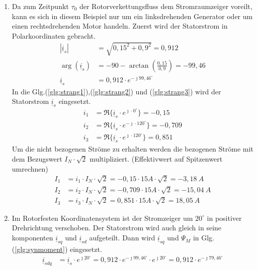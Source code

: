 \begin{solution}
	\begin{enumerate}
		\item Da zum Zeitpunkt $\tau_0$ der Rotorverkettungsfluss dem Stromraumzeiger voreilt, kann es sich in diesem Beispiel nur um ein linksdrehenden Generator oder um einen rechtsdrehenden Motor handeln. Zuerst wird der Statorstrom in Polarkoordinaten gebracht.
		\begin{align}
			|\underline{i}_s|  &= \sqrt{0,15^2 + 0,9^2}= 0,912 \\
			\arg(\underline{i}_s) & =-90 - \arctan\left (\frac{0,15}{0,9} \right ) =-99,46 \\
			\underline{i}_s  &= 0,912 \cdot e^{-\jmath 99,46 ^\circ}
		\end{align}
		In die Glg.(\ref{glg:strang1}),(\ref{glg:strang2}) und (\ref{glg:strang3}) wird der Statorstrom $\underline{i}_s$ eingesetzt.
		\begin{align}
			i_1 & = \Re \{ \underline{i}_s \cdot e^{\jmath \cdot 0 ^\circ} \} = -0,15\\
			i_2 & = \Re \{ \underline{i}_s \cdot e^{-\jmath \cdot 120 ^\circ} \} = -0,709 \\
			i_3 & = \Re \{ \underline{i}_s \cdot e^{\jmath \cdot 120 ^\circ} \}=  0,851
		\end{align}
		Um die nicht bezogenen Ströme zu erhalten werden die bezogenen Ströme mit dem Bezugswert $I_N \cdot \sqrt{2}$ multipliziert. (Effektivwert auf Spitzenwert umrechnen)
		\begin{align}
			I_1 & = i_1 \cdot I_N \cdot \sqrt{2} = -0,15 \cdot 15 A \cdot \sqrt{2} =-3,18~A \\
			I_2 & = i_2 \cdot I_N \cdot \sqrt{2} = -0,709 \cdot 15 A \cdot \sqrt{2} = -15,04~A\\
			I_3 & = i_3 \cdot I_N \cdot \sqrt{2} = 0,851\cdot 15 A \cdot \sqrt{2} =18,05~A
		\end{align}
		\item Im Rotorfesten Koordinatensystem ist der Stromzeiger um $20^\circ$ in positiver Drehrichtung verschoben. Der Statorstrom wird auch gleich in seine komponenten $\underline{i}_{sq}$ und $\underline{i}_{sd}$ aufgeteilt. Dann wird $\underline{i}_{sq}$ und $\Psi_M$ in Glg.(\ref{glg:synmoment}) eingesetzt.
		\begin{align}
			\underline{i}_{sdq} & = \underline{i}_s \cdot e^{\jmath 20 ^\circ} = 0,912 \cdot e^{-\jmath 99,46 ^\circ} \cdot e^{\jmath 20 ^\circ} = 0,912 \cdot e^{-\jmath 79,46 ^\circ} \\

\end{align}
\end{enumerate}
\end{solution}
